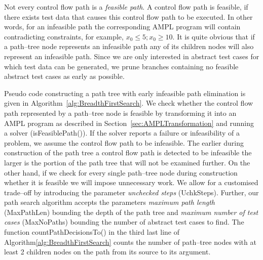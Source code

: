 \documentclass[runningheads,a4paper]{llncs}%
\newcommand{\UMLType}[1]{\textsf{\textit{#1}}} %
\begin{document}
Not every control flow path is a \emph{feasible path}. A control flow path is
feasible, if there exists test data that causes this control flow path to be
executed. In other words, for an infeasible path the corresponding AMPL program
will contain contradicting constraints, for example, $x_0\leq5; x_0\geq10$. It
is quite obvious that if a path--tree node represents an infeasible path any of
its children nodes will also represent an infeasible path. Since we are only
interested in abstract test cases for which test data can be generated, we prune
branches containing no feasible abstract test cases as early as possible.

Pseudo code constructing a path tree with early infeasible path elimination is
given in Algorithm~\ref{alg:BreadthFirstSearch}. We check whether the
control flow path represented by a path--tree node is feasible by transforming
it into an AMPL program as described in Section~\ref{sec:AMPLTransformation} and
running a solver (isFeasiblePath()). If the solver reports a failure or
infeasibility of a problem, we assume the control flow path to be infeasible.
The earlier during construction of the path tree a control flow path is
detected to be infeasible the larger is the portion of the path tree that will
not be examined further. On the other hand, if we check for every single
path--tree node during construction whether it is feasible we will impose
unnecessary work. We allow for a customised trade--off by introducing the
parameter \emph{unchecked steps} (UchkSteps). Further, our path search algorithm
accepts the parameters \emph{maximum path length} (MaxPathLen) bounding the
depth of the path tree and \emph{maximum number of test cases} (MaxNoPaths)
bounding the number of abstract test cases to find. The function
countPathDecisionsTo() in the third last line of
Algorithm\ref{alg:BreadthFirstSearch} counts the number of path--tree nodes with
at least 2 children nodes on the path from its source to its argument. %
\end{document}
